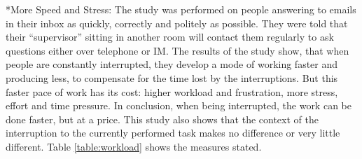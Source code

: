 \documentclass[11pt,singleside]{myfithesis2}
\makeatletter
\renewcommand\paragraph{
   \vspace{-10pt}
   \@startsection{paragraph}{4}{0mm}
      {\baselineskip}
      {- 5pt}
      {\normalfont\normalsize\bfseries}
}
\makeatother
\begin{document}
\paragraph*{More Speed and Stress: } The study \cite{studySpeedAndStress} was performed on people answering to emails in their inbox as quickly, correctly and politely as possible. They were told that their ``supervisor'' sitting in another room will contact them regularly to ask questions either over telephone or IM. The results of the study show, that when people are constantly interrupted, they develop a mode of working faster and producing less, to compensate for the time lost by the interruptions. But this faster pace of work has its cost: higher workload and frustration, more stress, effort and time pressure. In conclusion, when being interrupted, the work can be done faster, but at a price. This study also shows that the context of the interruption to the currently performed task makes no difference or very little different. Table \ref{table:workload} shows the measures stated.
\begin{table}[h]
\centering
{}
\caption{Mean workload measures across interruption types. Scale is 1(low)-20(high).}
\label{table:workload}
\end{table}
\end{document}
